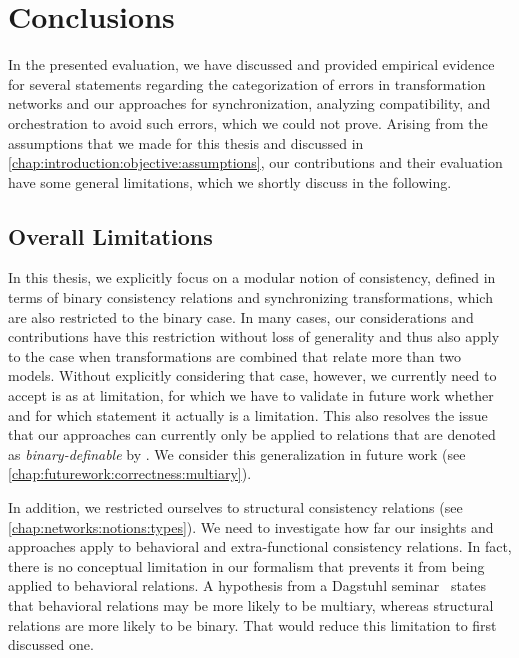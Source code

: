 \section{Conclusions}

In the presented evaluation, we have discussed and provided empirical evidence for several statements regarding the categorization of errors in transformation networks and our approaches for synchronization, analyzing compatibility, and orchestration to avoid such errors, which we could not prove.
Arising from the assumptions that we made for this thesis and discussed in \autoref{chap:introduction:objective:assumptions}, our contributions and their evaluation have some general limitations, which we shortly discuss in the following.

\subsection{Overall Limitations}

In this thesis, we explicitly focus on a modular notion of consistency, defined in terms of binary consistency relations and synchronizing transformations, which are also restricted to the binary case.
In many cases, our considerations and contributions have this restriction without loss of generality and thus also apply to the case when transformations are combined that relate more than two models.
Without explicitly considering that case, however, we currently need to accept is as at limitation, for which we have to validate in future work whether and for which statement it actually is a limitation.
This also resolves the issue that our approaches can currently only be applied to relations that are denoted as \emph{binary-definable} by \textcite{stevens2020BidirectionalTransformationLarge-SoSym}.
We consider this generalization in future work (see \autoref{chap:futurework:correctness:multiary}).

In addition, we restricted ourselves to structural consistency relations (see \autoref{chap:networks:notions:types}).
We need to investigate how far our insights and approaches apply to behavioral and extra-functional consistency relations.
In fact, there is no conceptual limitation in our formalism that prevents it from being applied to behavioral relations.
A hypothesis from a Dagstuhl seminar~\cite{cleve2019dagstuhl} states that behavioral relations may be more likely to be multiary, whereas structural relations are more likely to be binary.
That would reduce this limitation to first discussed one.

